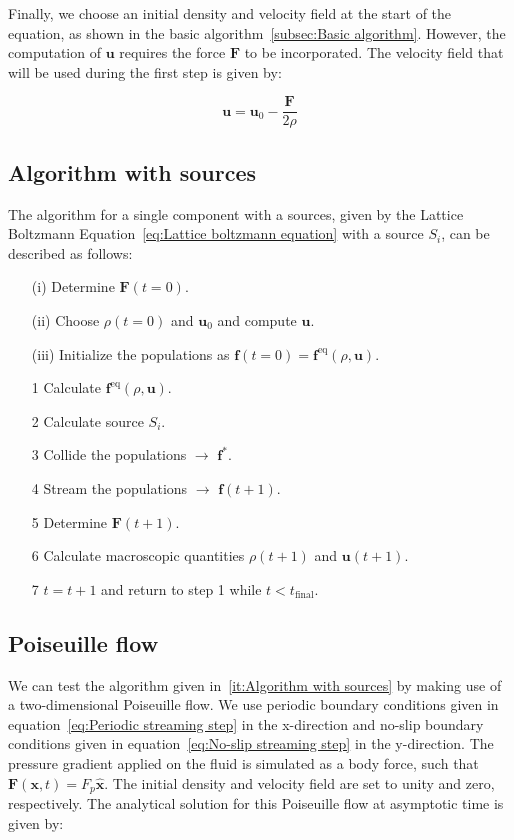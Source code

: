 Finally, we choose an initial density and velocity field at the start of the equation, as shown in the basic algorithm~\ref{subsec:Basic algorithm}. However, the computation of $\bm{u}$ requires the force $\bm{F}$ to be incorporated. The velocity field that will be used during the first step is given by:

\begin{equation}
    \bm{u} = \bm{u}_0 - \frac{\bm{F}}{2\rho}
\end{equation}

\subsection{Algorithm with sources}
The algorithm for a single component with a sources, given by the Lattice Boltzmann Equation~\ref{eq:Lattice boltzmann equation} with a source $S_i$, can be described as follows:

\begin{itemize}\label{it:Algorithm with sources}
    \item[(i)] Determine $\bm{F}(t=0)$.
    \item[(ii)] Choose $\rho(t=0)$ and $\bm{u}_0$ and compute $\bm{u}$.
    \item[(iii)] Initialize the populations as $\bm{f}(t=0) = \bm{f}^{\text{eq}}(\rho, \bm{u})$. 
    \item[1] Calculate $\bm{f}^{\text{eq}}(\rho, \bm{u})$.
    \item[2] Calculate source $S_i$.
    \item[3] Collide the populations $\rightarrow$ $\bm{f}^*$.
    \item[4] Stream the populations $\rightarrow$ $\bm{f}(t + 1)$.
    \item[5] Determine $\bm{F}(t + 1)$.
    \item[6] Calculate macroscopic quantities $\rho(t + 1)$ and $\bm{u}(t + 1)$.
    \item[7] $t = t + 1$ and return to step 1 while $t < t_{\text{final}}$.
\end{itemize}

\subsection{Poiseuille flow}
We can test the algorithm given in~\ref{it:Algorithm with sources} by making use of a two-dimensional Poiseuille flow. We use periodic boundary conditions given in equation~\ref{eq:Periodic streaming step} in the x-direction and no-slip boundary conditions given in equation~\ref{eq:No-slip streaming step} in the y-direction. The pressure gradient applied on the fluid is simulated as a body force, such that $\bm{F}(\bm{x}, t) = F_p \hat{\bm{x}}$. The initial density and velocity field are set to unity and zero, respectively. The analytical solution for this Poiseuille flow at asymptotic time is given by:

